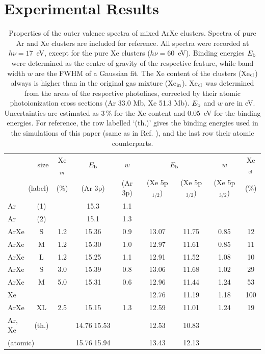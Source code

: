 \section{Experimental Results
\label{sec:exp_results}}


\begin{table}
\caption{Properties of the outer valence spectra of mixed ArXe clusters. Spectra of pure Ar and Xe clusters are included for reference. All spectra were recorded at $h\nu = 17$~eV, except for the pure Xe clusters ($h\nu = 60$~eV). Binding energies $E_{\rm b}$ were determined as the centre of gravity of the respective feature, while band width $w$ are the FWHM of a Gaussian fit. The Xe content of the clusters (Xe$_{\rm cl}$) always is higher than in the original gas mixture (Xe$_{\rm in}$). Xe$_{\rm cl}$ was determined from the areas of the respective photolines, corrected by their atomic photoionization cross sections (Ar 33.0 Mb, Xe 51.3 Mb)\cite{samson2002}. $E_{\rm b}$ and $w$ are in eV. Uncertainties are estimated as 3\,\% for the Xe content and 0.05~eV for the binding energies. For reference, the row labelled `(th.)' gives the binding energies used in the simulations of this paper (same as in Ref. ), and the last row their atomic counterparts.
\label{tab:valence} }
\begin{tabular}{ l c c c c c c c c}
%
\toprule
 \multicolumn{2}{r}{size} &  Xe$_{in}$& $E_{\rm b}$ & $w$& \multicolumn{2}{c}{$E_{\rm b}$}  & $w$ &  Xe$_{\rm cl}$ \\
%
 \multicolumn{2}{r}{(label)}&  (\%) & (Ar 3p) & (Ar 3p) & (Xe 5p$_{1/2}$) &  (Xe 5p$_{3/2}$) & (Xe 5p$_{3/2}$)  &  (\%) \\
\midrule
 Ar & (1) &&  15.3  &  1.1 & & & &  \\
 Ar & (2) &&  15.1  &  1.3 & & & &  \\
%
 ArXe & S &1.2 & 15.36 & 0.9 & 13.07 & 11.75 & 0.85 & 12\\
 ArXe & M &1.2 & 15.30 & 1.0 & 12.97 & 11.61 & 0.85 & 11\\
 ArXe & L &1.2 & 15.25 & 1.1 & 12.91 & 11.52 & 1.08 & 10\\
 ArXe & S &3.0 & 15.39 & 0.8 & 13.06 & 11.68 & 1.02 & 29\\
 ArXe & M &5.0 & 15.31 & 0.6 & 12.96 & 11.44 & 1.24 & 53\\
 Xe &  & & & & 12.76 & 11.19 & 1.18 & 100\\
%
\midrule
%
 ArXe & XL &2.5 & 15.15 & 1.3 & 12.59 & 11.01 & 1.24 & 19\\
%
\midrule
%
 Ar, Xe & (th.) && 14.76|15.53 && 12.53 & 10.83 &&\\
%
 \multicolumn{2}{l}{(atomic)\cite{velchev,sansonetti}} && 15.76|15.94 && 13.43 & 12.13 &&\\
%
\bottomrule
\end{tabular}
\end{table}


